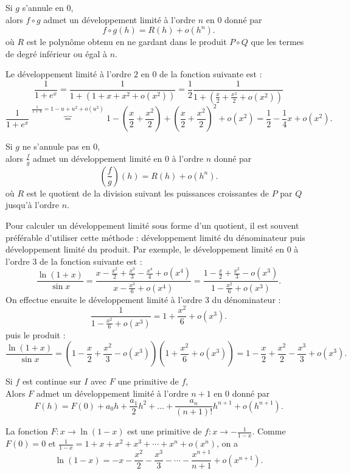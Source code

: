 \documentclass{book}
\begin{document}
\begin{Proposition}[Composition] 
Si $g$ s'annule en $0$,\\
alors $f\circ g$ admet un développement limité à l'ordre $n$ en $0$ donné par
$$f\circ g(h)=R(h)+o(h^n).$$
où $R$ est le polynôme obtenu en ne gardant dans le produit $P\circ Q$ que les termes de degré inférieur ou égal à $n$.
\end{Proposition}
\begin{Exemple}
Le développement limité à l'ordre $2$ en $0$ de la fonction suivante est :
$$\frac{1}{1 +e^x}=\frac{1}{1+(1+x+x^2+o(x^2))}=\frac{1}{2}\frac{1}{1 + (\frac{x}{2}+\frac{x^2}{2}+o(x^2))}$$ 
$$\frac{1}{1 +e^x}\overbrace{=}^{\frac{1}{1+u}=1-u+u^2 +o(u^2)}1-\left(\frac{x}{2}+\frac{x^2}{2}\right)+\left(\frac{x}{2}+\frac{x^2}{2}\right)^2+o(x^2)=\frac{1}{2}-\frac 1 4 x +o(x^2).$$
\end{Exemple}
\begin{Proposition}[Quotient]
Si $g$ ne s'annule pas en $0$,\\
alors $\frac f g$ admet un développement limité en $0$ à l'ordre $n$ donné par
$$\left(\frac f g \right)(h)=R(h)+o(h^n).$$
où $R$ est le quotient de la division suivant les puissances croissantes de $P$ par $Q$ jusqu'à l'ordre $n$.
\end{Proposition}
\begin{Remarque}
Pour calculer un développement limité sous forme d'un quotient, il est souvent préférable d'utiliser cette méthode : développement limité du dénominateur puis développement limité du produit.  Par exemple,  le développement limité en 0 à l'ordre 3 de la fonction suivante est :
$$\frac{\ln(1+x)}{\sin x}=\frac{x-\frac{x^2}{2}+\frac{x^3}{3}-\frac{x^4}{4}+o(x^4)}{x-\frac{x^3}{6}+o(x^4)}=\frac{1-\frac{x}{2}+\frac{x^2}{3}-o(x^3)}{1-\frac{x^2}{6}+o(x^3)}.$$
On effectue ensuite le développement limité à l'ordre 3 du dénominateur : 
$$\frac{1}{1-\frac{x^2}{6}+o(x^3)}=1+\frac{x^2}{6}+o(x^3).$$
puis le produit  :
$$\frac{\ln(1+x)}{\sin x}= \left(1-\frac{x}{2}+\frac{x^2}{3}-o(x^3)\right) \left(1+\frac{x^2}{6}+o(x^3)\right)= 1-\frac{x}{2}+\frac{x^2}{2}-\frac{x^3}{3}+o(x^3).$$
\end{Remarque}
\begin{Proposition}[Intégration]
Si $f$ est continue sur $I$ avec $F$ une primitive de $f$,\\
Alors $F$ admet un développement limité à l'ordre $n+1$ en $0$ donné par
$$F(h)=F(0)+a_0 h+\frac{a_1}{2}h^2+\dots +\frac{a_n}{(n+1)!}h^{n+1}+o(h^{n+1}).$$
\end{Proposition}
\begin{Exemple}[Quotient]
La fonction $F:x\to \ln(1-x)$ est une primitive de $f:x\to -\frac{1}{1-x}.$ Comme $F(0)=0$ et $\frac {1}{1-x}=1+x+x^{2}+x^{3}+\cdots +x^{n}+o(x^{n})$, on a
$$ \ln(1-x)=-x-{\frac {x^{2}}{2}}-{\frac {x^{3}}{3}}-\cdots -{\frac {x^{n+1}}{n+1}}+o(x^{n+1}).$$
\end{Exemple}
\end{document}
